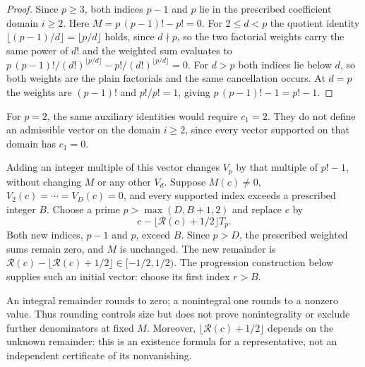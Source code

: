 \documentclass[11pt]{article}
\begin{document}
\begin{proof}
Since $p\ge3$, both indices $p-1$ and $p$ lie in the prescribed coefficient
domain $i\ge2$.  Here $M=p\,(p-1)!-p!=0$.  For $2\le d<p$ the quotient identity
$\lfloor(p-1)/d\rfloor=\lfloor p/d\rfloor$ holds, since $d\nmid p$, so the
two factorial weights carry the same power of $d!$ and the weighted sum evaluates to
$p\,(p-1)!/(d!)^{\lfloor p/d\rfloor}-p!/(d!)^{\lfloor p/d\rfloor}=0$.  For
$d>p$ both indices lie below $d$, so both weights are the plain factorials
and the same cancellation occurs.  At $d=p$ the weights are $(p-1)!$ and
$p!/p!=1$, giving $p\,(p-1)!-1=p!-1$.
\end{proof}

For $p=2$, the same auxiliary identities would require $c_1=2$.  They do
not define an admissible vector on the domain $i\ge2$, since every vector
supported on that domain has $c_1=0$.

\noindent Adding an integer multiple of this vector changes $V_p$ by
that multiple of $p!-1$, without changing $M$ or any other $V_d$.
Suppose $M(c)\ne0$, $V_2(c)=\cdots=V_D(c)=0$, and every
supported index exceeds a prescribed integer $B$. Choose a prime
$p>\max(D,B+1,2)$ and replace $c$ by
\[
 c-\lfloor\mathcal R(c)+1/2\rfloor T_p.
\]
Both new indices, $p-1$ and $p$, exceed $B$. Since $p>D$, the prescribed
weighted sums remain zero, and $M$ is unchanged. The new remainder is
$\mathcal R(c)-\lfloor\mathcal R(c)+1/2\rfloor\in[-1/2,1/2)$.
The progression construction below supplies such an initial vector:
choose its first index $r>B$.

An integral remainder rounds to zero; a nonintegral one rounds to a
nonzero value. Thus rounding controls size but does not prove
nonintegrality or exclude further denominators at fixed $M$.
Moreover, $\lfloor\mathcal R(c)+1/2\rfloor$ depends on the unknown
remainder: this is an existence formula for a representative, not an
independent certificate of its nonvanishing.
\end{document}
